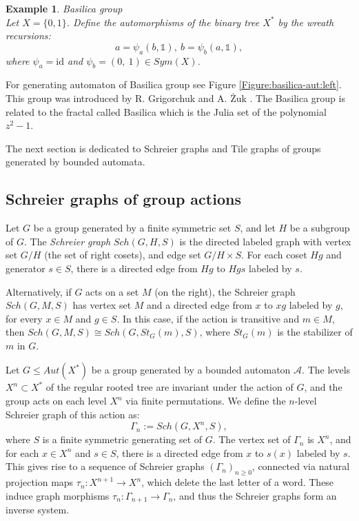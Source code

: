 \documentclass{article}
\newtheorem{myexa}{Example}[section]
\newcommand{\A}{\mathcal{A}}
\newcommand{\G}{\Gamma}
\newcommand{\id}{\mathds{1}}
\newcommand{\idperm}{\mathrm{id}}
\begin{document}
\begin{myexa} Basilica group \label{basilica-gr-ex}\\
	Let $X = \{0,1\}$. Define the automorphisms of the binary tree $X^*$ by the wreath recursions:
	\begin{equation} \label{Equation:wr-B-group}
	a = \psi_a (b, \id),~ b = \psi_b (a, \id),
	\end{equation}
	where $\psi_a = \idperm$ and $\psi_b = (0,~1) \in Sym(X).$    
\end{myexa} For generating automaton of Basilica group see Figure \ref{Figure:basilica-aut:left}. This group was introduced by R. Grigorchuk and A. {\.Z}uk \cite{grigorchuk2002torsion}. The Basilica group is related to the fractal called Basilica which is the Julia set of the polynomial $z^2-1$. 
 
The next section is dedicated to Schreier graphs and Tile graphs of groups generated by bounded automata.

\subsection{Schreier graphs of group actions}

Let $G$ be a group generated by a finite symmetric set $S$, and let $H$ be a subgroup of $G$. The \emph{Schreier graph} $Sch(G, H, S)$ is the directed labeled graph with vertex set $G/H$ (the set of right cosets), and edge set $G/H \times S$. For each coset $Hg$ and generator $s \in S$, there is a directed edge from $Hg$ to $Hgs$ labeled by $s$.

Alternatively, if $G$ acts on a set $M$ (on the right), the Schreier graph $Sch(G, M, S)$ has vertex set $M$ and a directed edge from $x$ to $xg$ labeled by $g$, for every $x \in M$ and $g \in S$. In this case, if the action is transitive and $m \in M$, then $Sch(G, M, S) \cong Sch(G, St_G(m), S)$, where $St_G(m)$ is the stabilizer of $m$ in $G$.

Let $G \leq Aut(X^*)$ be a group generated by a bounded automaton $\A$. The levels $X^n \subset X^*$ of the regular rooted tree are invariant under the action of $G$, and the group acts on each level $X^n$ via finite permutations. We define the $n$-level Schreier graph of this action as:
$$\G_n := Sch(G, X^n, S),$$
where $S$ is a finite symmetric generating set of $G$. The vertex set of $\G_n$ is $X^n$, and for each $x \in X^n$ and $s \in S$, there is a directed edge from $x$ to $s(x)$ labeled by $s$. This gives rise to a sequence of Schreier graphs $(\G_n)_{n \geq 0}$, connected via natural projection maps $\tau_n : X^{n+1} \to X^n$, which delete the last letter of a word. These induce graph morphisms $\tau_n : \G_{n+1} \to \G_n$, and thus the Schreier graphs form an inverse system.
\end{document}

